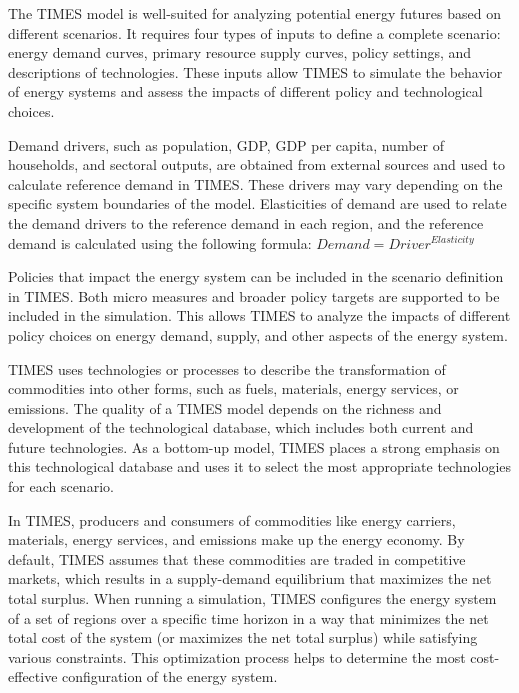 \documentclass[lettersize,journal]{IEEEtran}
\begin{document}
  The TIMES model is well-suited for analyzing potential energy futures based on different scenarios. It requires four types of inputs to define a complete scenario: energy demand curves, primary resource supply curves, policy settings, and descriptions of technologies. These inputs allow TIMES to simulate the behavior of energy systems and assess the impacts of different policy and technological choices.

  Demand drivers, such as population, GDP, GDP per capita, number of households, and sectoral outputs, are obtained from external sources and used to calculate reference demand in TIMES. These drivers may vary depending on the specific system boundaries of the model. Elasticities of demand are used to relate the demand drivers to the reference demand in each region, and the reference demand is calculated using the following formula:
  $Demand=Driver^{Elasticity}$

  Policies that impact the energy system can be included in the scenario definition in TIMES. Both micro measures and broader policy targets are supported to be included in the simulation. This allows TIMES to analyze the impacts of different policy choices on energy demand, supply, and other aspects of the energy system.

  TIMES uses technologies or processes to describe the transformation of commodities into other forms, such as fuels, materials, energy services, or emissions. The quality of a TIMES model depends on the richness and development of the technological database, which includes both current and future technologies. As a bottom-up model, TIMES places a strong emphasis on this technological database and uses it to select the most appropriate technologies for each scenario.

  In TIMES, producers and consumers of commodities like energy carriers, materials, energy services, and emissions make up the energy economy. By default, TIMES assumes that these commodities are traded in competitive markets, which results in a supply-demand equilibrium that maximizes the net total surplus. When running a simulation, TIMES configures the energy system of a set of regions over a specific time horizon in a way that minimizes the net total cost of the system (or maximizes the net total surplus) while satisfying various constraints. This optimization process helps to determine the most cost-effective configuration of the energy system.
\end{document}
